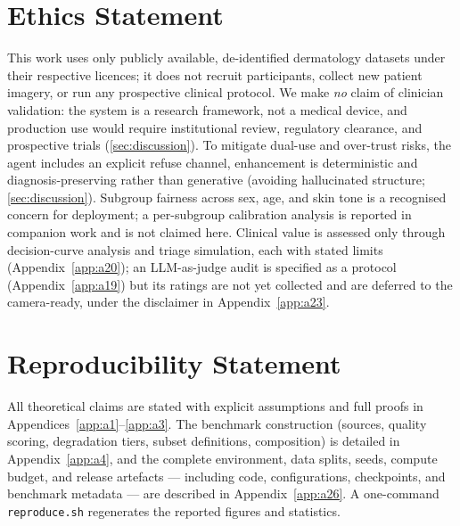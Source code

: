 \documentclass[runningheads]{llncs}
\begin{document}
\section*{Ethics Statement}\label{sec:ethics}
This work uses only publicly available, de-identified dermatology datasets under their respective
licences; it does not recruit participants, collect new patient imagery, or run any prospective
clinical protocol. We make \emph{no} claim of clinician validation: the system is a research
framework, not a medical device, and production use would require institutional review, regulatory
clearance, and prospective trials (\cref{sec:discussion}). To mitigate dual-use and over-trust risks,
the agent includes an explicit refuse channel, enhancement is deterministic and diagnosis-preserving
rather than generative (avoiding hallucinated structure; \cref{sec:discussion}). Subgroup fairness
across sex, age, and skin tone is a recognised concern for deployment; a per-subgroup calibration
analysis is reported in companion work and is not claimed here. Clinical value is assessed only
through decision-curve analysis and triage simulation, each with
stated limits (Appendix~\ref{app:a20}); an LLM-as-judge audit is specified as a protocol
(Appendix~\ref{app:a19}) but its ratings are not yet collected and are deferred to the
camera-ready, under the disclaimer in Appendix~\ref{app:a23}.

\section*{Reproducibility Statement}\label{sec:repro}
All theoretical claims are stated with explicit assumptions and full proofs in
Appendices~\ref{app:a1}--\ref{app:a3}. The benchmark construction (sources, quality scoring,
degradation tiers, subset definitions, composition) is detailed in Appendix~\ref{app:a4}, and the
complete environment, data splits, seeds, compute budget, and release artefacts --- including code,
configurations, checkpoints, and benchmark metadata --- are described in Appendix~\ref{app:a26}. A
one-command \texttt{reproduce.sh} regenerates the reported figures and statistics.


\appendix




















\end{document}
